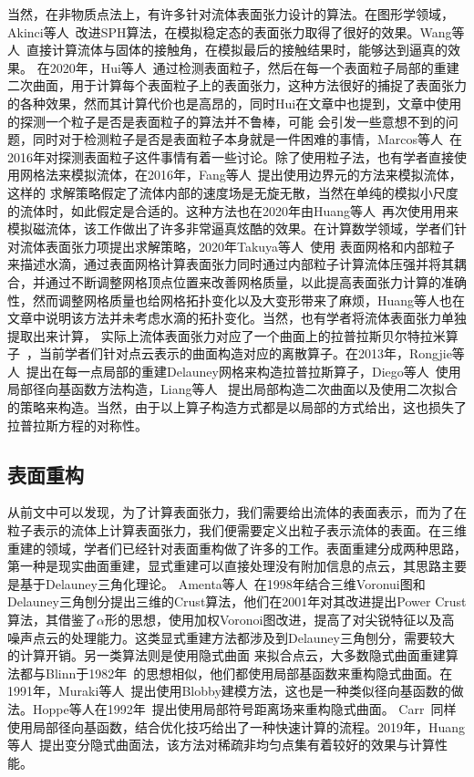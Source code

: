当然，在非物质点法上，有许多针对流体表面张力设计的算法。在图形学领域，Akinci等人~\cite{akinci2013versatile}改进SPH算法，在模拟稳定态的表面张力取得了很好的效果。Wang等人~\cite{wang2005water}直接计算流体与固体的接触角，在模拟最后的接触结果时，能够达到逼真的效果。
在2020年，Hui等人~\cite{wang2020codimensional}通过检测表面粒子，然后在每一个表面粒子局部的重建二次曲面，用于计算每个表面粒子上的表面张力，这种方法很好的捕捉了表面张力的各种效果，然而其计算代价也是高昂的，同时Hui在文章中也提到，文章中使用的探测一个粒子是否是表面粒子的算法并不鲁棒，可能
会引发一些意想不到的问题，同时对于检测粒子是否是表面粒子本身就是一件困难的事情，Marcos等人~\cite{sandim2016boundary}在2016年对探测表面粒子这件事情有着一些讨论。除了使用粒子法，也有学者直接使用网格法来模拟流体，在2016年，Fang等人~\cite{da2016surface}提出使用边界元的方法来模拟流体，这样的
求解策略假定了流体内部的速度场是无旋无散，当然在单纯的模拟小尺度的流体时，如此假定是合适的。这种方法也在2020年由Huang等人~\cite{huang2020surface}再次使用用来模拟磁流体，该工作做出了许多非常逼真炫酷的效果。在计算数学领域，学者们针对流体表面张力项提出求解策略，2020年Takuya等人~\cite{matsunaga2020moving}使用
表面网格和内部粒子来描述水滴，通过表面网格计算表面张力同时通过内部粒子计算流体压强并将其耦合，并通过不断调整网格顶点位置来改善网格质量，以此提高表面张力计算的准确性，然而调整网格质量也给网格拓扑变化以及大变形带来了麻烦，Huang等人也在文章中说明该方法并未考虑水滴的拓扑变化。当然，也有学者将流体表面张力单独提取出来计算，
实际上流体表面张力对应了一个曲面上的拉普拉斯贝尔特拉米算子~\cite{needham2021visual}，当前学者们针对点云表示的曲面构造对应的离散算子。在2013年，Rongjie等人~\cite{lai2013local}提出在每一点局部的重建Delauney网格来构造拉普拉斯算子，Diego等人~\cite{alvarez2021local}使用局部径向基函数方法构造，Liang等人~\cite{liang2013solving}
提出局部构造二次曲面以及使用二次拟合的策略来构造。当然，由于以上算子构造方式都是以局部的方式给出，这也损失了拉普拉斯方程的对称性。
\subsection{表面重构} 
从前文中可以发现，为了计算表面张力，我们需要给出流体的表面表示，而为了在粒子表示的流体上计算表面张力，我们便需要定义出粒子表示流体的表面。在三维重建的领域，学者们已经针对表面重构做了许多的工作。表面重建分成两种思路，第一种是现实曲面重建，显式重建可以直接处理没有附加信息的点云，其思路主要是基于Delauney三角化理论。
Amenta等人~\cite{amenta1998new}在1998年结合三维Voronui图和Delauney三角刨分提出三维的Crust算法，他们在2001年对其改进提出Power Crust算法，其借鉴了$\alpha$形的思想，使用加权Voronoi图改进，提高了对尖锐特征以及高噪声点云的处理能力。这类显式重建方法都涉及到Delauney三角刨分，需要较大的计算开销。另一类算法则是使用隐式曲面
来拟合点云，大多数隐式曲面重建算法都与Blinn于1982年~\cite{blinn1982generalization}的思想相似，他们都使用局部基函数来重构隐式曲面。在1991年，Muraki等人~\cite{muraki1991volumetric}提出使用Blobby建模方法，这也是一种类似径向基函数的做法。Hoppe等人在1992年~\cite{hoppe1992surface}提出使用局部符号距离场来重构隐式曲面。
Carr~\cite{carr2001reconstruction}同样使用局部径向基函数，结合优化技巧给出了一种快速计算的流程。2019年，Huang等人~\cite{2019wang}提出变分隐式曲面法，该方法对稀疏非均匀点集有着较好的效果与计算性能。

